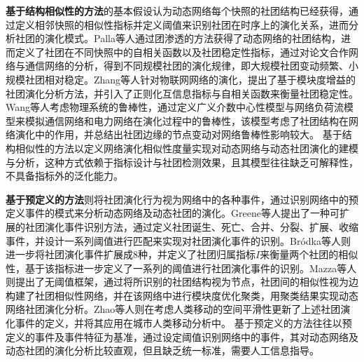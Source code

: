 \begin{table}[htbp]
	\caption{社团演化分析方法分类对比简表}
	\vspace{0.5em}\centering\wuhao
	\label{chap1:tab:ievolution}
\end{table}

\textbf{基于结构相似性的方法}的基本假设认为动态网络每个快照的社团结构已经获得，通过定义相邻快照的相似性指标并定义阈值来识别社团在时序上的演化关系，进而分析社团的演化模式。Palla等人\cite{palla2007quantifying}通过团渗透的方法获得了动态网络的社团结构，进而定义了社团在不同快照中的自相关函数以及社团稳定性指标，通过对论文合作网络与通信网络的分析，得到不同规模社团的演化规律，即大规模社团变动频繁、小规模社团相对稳定。Zhang等人\cite{zhong2014evolution}针对物联网网络的演化，提出了基于模块度增益的社团演化分析方法，并引入了正则化互信息指标与自相关函数来衡量社团稳定性。Wang等人\cite{wang2024community}考虑物理系统的鲁棒性，通过定义广义介数中心性模型与网络负荷流模型来模拟通信网络和电力网络在演化过程中的鲁棒性，该模型考虑了社团结构在网络演化中的作用，并总结出社团边缘的节点变动对网络鲁棒性影响较大。
基于结构相似性的方法以定义网络演化相似性度量实现对动态网络与动态社团演化的建模与分析，这种方式依赖于指标设计与社团检测效果，且其模型往往缺乏可解释性，不具备指标外的泛化能力。


\textbf{基于预定义的方法}则将社团演化行为视为网络中的各种事件，通过识别网络中的预定义事件的模式来分析动态网络及动态社团的演化。Greene等人\cite{greene2010tracking}提出了一种可扩展的社团演化事件识别方法，通过定义社团诞生、死亡、合并、分裂、扩展、收缩事件，并设计一系列阈值进行匹配来实现对社团演化事件的识别。Br{\'o}dka等人\cite{brodka2013ged}则进一步将社团演化事件扩展成$8$种，并定义了社团归属指标$I$来衡量两个社团的相似性，基于该指标进一步定义了一系列的阈值进行社团演化事件的识别。Mazza等人\cite{mazza2023modularity}则提出了无阈值框架，通过将所识别的社团结构视为节点，社团间的相似性视为边构建了社团相似性网络，并在该网络中进行模块度优化聚类，用聚类结果实现动态网络社团演化分析。Zhao等人\cite{zhao2023dynamic}则在考虑人类移动的空间平滑性更新了上述社团演化事件的定义，并将其应用在城市人类移动分析中。
基于预定义的方法往往以预定义的事件及事件特征为基准，通过设定阈值识别网络中的事件，其对动态网络及动态社团的演化分析比较直观，但且缺乏统一标准，需要人工信息指导。

